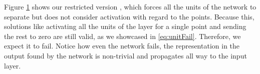 \begin{figure}
{{    %
    }
    \parbox{.195\textwidth}{%
    }
  }
  \caption{\SepUnit}
    \label{fig:moonsUnitwise}
\end{figure}


Figure \ref{fig:moonsUnitwise} shows our restricted version \SepUnit, which forces all the units of the network to separate but does not consider activation with regard to the points. Because this, solutions like activating all the units of the layer for a single point and sending the rest to zero are still valid, as we showcased in \ref{eq:unitFail}. Therefore, we expect it to fail. Notice how even the network fails, the representation in the output found by the network is non-trivial and propagates all way to the input layer.

